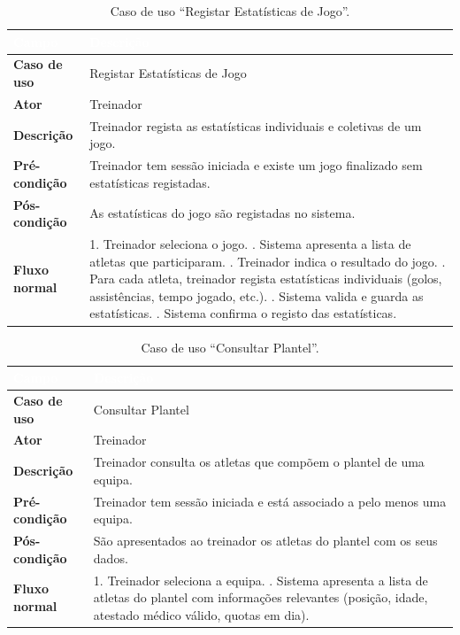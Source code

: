 \documentclass[a4paper,12pt]{scrreprt}
\begin{document}
{
\begin{table}[H]
\centering
\begin{tabularx}{\textwidth}{|l|X|}
\hline
\rowcolor{headerblue}\textcolor{white}{\textbf{Campo}} & \textcolor{white}{\textbf{Descrição}} \\ \hline
\textbf{Caso de uso} & Registar Estatísticas de Jogo \\ \hline
\textbf{Ator} & Treinador \\ \hline
\textbf{Descrição} & Treinador regista as estatísticas individuais e coletivas de um jogo. \\ \hline
\textbf{Pré-condição} & Treinador tem sessão iniciada e existe um jogo finalizado sem estatísticas registadas. \\ \hline
\textbf{Pós-condição} & As estatísticas do jogo são registadas no sistema. \\ \hline
\textbf{Fluxo normal} &
1. Treinador seleciona o jogo. \newline
2. Sistema apresenta a lista de atletas que participaram. \newline
3. Treinador indica o resultado do jogo. \newline
4. Para cada atleta, treinador regista estatísticas individuais (golos, assistências, tempo jogado, etc.). \newline
5. Sistema valida e guarda as estatísticas. \newline
6. Sistema confirma o registo das estatísticas. \\ \hline
\end{tabularx}
\caption{Caso de uso ``Registar Estatísticas de Jogo''.}
\label{tab:uc_registar_estatisticas}
\end{table}

\begin{table}[H]
\centering
\begin{tabularx}{\textwidth}{|l|X|}
\hline
\rowcolor{headerblue}\textcolor{white}{\textbf{Campo}} & \textcolor{white}{\textbf{Descrição}} \\ \hline
\textbf{Caso de uso} & Consultar Plantel \\ \hline
\textbf{Ator} & Treinador \\ \hline
\textbf{Descrição} & Treinador consulta os atletas que compõem o plantel de uma equipa. \\ \hline
\textbf{Pré-condição} & Treinador tem sessão iniciada e está associado a pelo menos uma equipa. \\ \hline
\textbf{Pós-condição} & São apresentados ao treinador os atletas do plantel com os seus dados. \\ \hline
\textbf{Fluxo normal} &
1. Treinador seleciona a equipa. \newline
2. Sistema apresenta a lista de atletas do plantel com informações relevantes (posição, idade, atestado médico válido, quotas em dia). \\ \hline
\end{tabularx}
\caption{Caso de uso ``Consultar Plantel''.}
\label{tab:uc_consultar_plantel}
\end{table}

}
\end{document}
